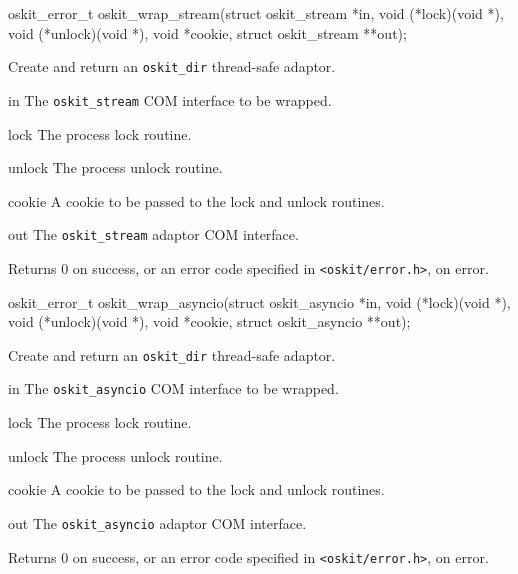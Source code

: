 \begin{apisyn}

	\funcproto oskit_error_t
	oskit_wrap_stream(struct oskit_stream *in, 
		void (*lock)(void *), 
		void (*unlock)(void *),
		void *cookie,
		struct oskit_stream **out);
\end{apisyn}
\begin{apidesc}
	Create and return an {\tt oskit_dir} thread-safe adaptor.
\end{apidesc}
\begin{apiparm}
	\item[in]
		The {\tt oskit_stream} COM interface to be wrapped.
	\item[lock]
		The process lock routine.
	\item[unlock]
		The process unlock routine.
	\item[cookie]
		A cookie to be passed to the lock and unlock routines.
	\item[out]
		The {\tt oskit_stream} adaptor COM interface.
\end{apiparm}
\begin{apiret}
	Returns 0 on success, or an error code specified in
	{\tt <oskit/error.h>}, on error.
\end{apiret}


\begin{apisyn}

	\funcproto oskit_error_t
	oskit_wrap_asyncio(struct oskit_asyncio *in, 
		void (*lock)(void *), 
		void (*unlock)(void *),
		void *cookie,
		struct oskit_asyncio **out);
\end{apisyn}
\begin{apidesc}
	Create and return an {\tt oskit_dir} thread-safe adaptor.
\end{apidesc}
\begin{apiparm}
	\item[in]
		The {\tt oskit_asyncio} COM interface to be wrapped.
	\item[lock]
		The process lock routine.
	\item[unlock]
		The process unlock routine.
	\item[cookie]
		A cookie to be passed to the lock and unlock routines.
	\item[out]
		The {\tt oskit_asyncio} adaptor COM interface.
\end{apiparm}
\begin{apiret}
	Returns 0 on success, or an error code specified in
	{\tt <oskit/error.h>}, on error.
\end{apiret}


